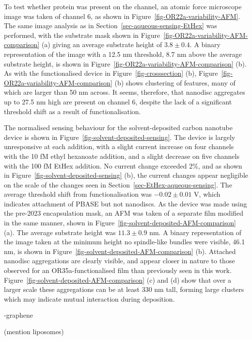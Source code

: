 \documentclass[
  a4paper,
]{scrbook}
\begin{document}
To test whether protein was present on the channel, an atomic force
microscope image was taken of channel 6, as shown in
Figure~\ref{fig-OR22a-variability-AFM}. The same image analysis as in
Section~\ref{sec-aqueous-sensing-EtHex} was performed, with the
substrate mask shown in
Figure~\ref{fig-OR22a-variability-AFM-comparison} (a) giving an average
substrate height of \(3.8\pm0.4\). A binary representation of the image
with a 12.5 nm threshold, 8.7 nm above the average substrate height, is
shown in Figure~\ref{fig-OR22a-variability-AFM-comparison} (b). As with
the functionalised device in Figure~\ref{fig-crosssection} (b),
Figure~\ref{fig-OR22a-variability-AFM-comparison} (b) shows clustering
of features, many of which are larger than 50 nm across. It seems,
therefore, that nanodisc aggregates up to 27.5 nm high are present on
channel 6, despite the lack of a significant threshold shift as a result
of functionalisation.

The normalised sensing behaviour for the solvent-deposited carbon
nanotube device is shown in Figure~\ref{fig-solvent-deposited-sensing}.
The device is largely unresponsive at each addition, with a slight
current increase on four channels with the 10 fM ethyl hexanoate
addition, and a slight decrease on five channels with the 100 fM EtHex
addition. No current change exceeded 2\%, and as shown in
Figure~\ref{fig-solvent-deposited-sensing} (b), the current changes
appear negligible on the scale of the changes seen in
Section~\ref{sec-EtHex-aqueous-sensing}. The average threshold shift
from functionalisation was \(-0.02\pm0.01\) V, which indicates
attachment of PBASE but not nanodiscs. As the device was made using the
pre-2023 encapsulation mask, an AFM was taken of a separate film
modified in the same manner, shown in
Figure~\ref{fig-solvent-deposited-AFM-comparison} (a). The average
substrate height was \(11.3\pm0.9\) nm. A binary representation of the
image taken at the minimum height no spindle-like bundles were visible,
46.1 nm, is shown in Figure~\ref{fig-solvent-deposited-AFM-comparison}
(b). Attached nanodisc aggregations are clearly visible, and appear
closer in nature to those observed for an OR35a-functionalised film
\autocite{Murugathas2020} than previously seen in this work.
Figure~\ref{fig-solvent-deposited-AFM-comparison} (c) and (d) show that
over a larger scale these aggregations can be at least 330 nm tall,
forming large clusters which may indicate mutual interaction during
deposition.

-graphene

(mention liposomes)
\end{document}
